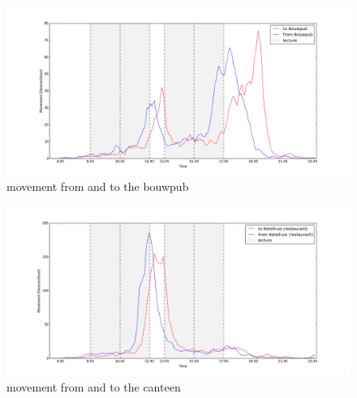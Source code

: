 \begin{figure}[H]
\centering
\includegraphics[scale=0.2]{buildingpart_fromTo_bouwpubGraph.png}
\captionsetup{justification=centering}
\caption{movement from and to the bouwpub}
\label{figure:ES-bouwpub}
\end{figure}

\begin{figure}[H]
\centering
\includegraphics[scale=0.2]{buildingpart_fromTo_canteenGraph.png}
\captionsetup{justification=centering}
\caption{movement from and to the canteen}
\label{figure:ES-canteen}
\end{figure}
